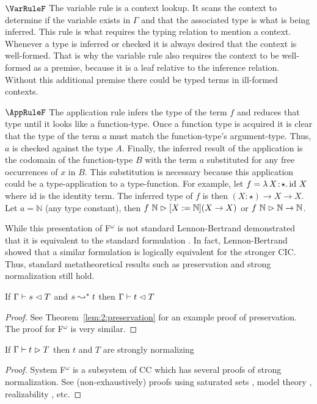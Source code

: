 $\VarRuleF$ The variable rule is a context lookup.
It scans the context to determine if the variable exists in $\Gamma$ and that the associated type is what is being inferred.
This rule is what requires the typing relation to mention a context.
Whenever a type is inferred or checked it is always desired that the context is well-formed.
That is why the variable rule also requires the context to be well-formed as a premise, because it is a leaf relative to the inference relation.
Without this additional premise there could be typed terms in ill-formed contexts.

$\AppRuleF$ The application rule infers the type of the term $f$ and reduces that type until it looks like a function-type.
Once a function type is acquired it is clear that the type of the term $a$ must match the function-type's argument-type.
Thus, $a$ is checked against the type $A$.
Finally, the inferred result of the application is the codomain of the function-type $B$ with the term $a$ substituted for any free occurrences of $x$ in $B$.
This substitution is necessary because this application could be a type-application to a type-function.
For example, let $f = {\lambda}\, X\! : \! \star.\, \text{id}\ X$ where id is the identity term.
The inferred type of $f$ is then $(X : \star) \to X \to X$.
Let $a = \mathbb{N}$ (any type constant), then $f\ \mathbb{N} \vartriangleright [X := \mathbb{N}](X \to X)$ or $f\ \mathbb{N} \infr \mathbb{N} \to \mathbb{N}$.

While this presentation of F$^\omega$ is not standard Lennon-Bertrand demonstrated that it is equivalent to the standard formulation \cite{lennon2021}.
In fact, Lennon-Bertrand showed that a similar formulation is logically equivalent for the stronger CIC.
Thus, standard metatheoretical results such as preservation and strong normalization still hold.

\begin{lemma}
    If $\Gamma \vdash s \vartriangleleft T$ and $s \leadsto^* t$ then $\Gamma \vdash t \vartriangleleft T$
\end{lemma}
\begin{proof}
    See Theorem~\ref{lem:2:preservation} for an example proof of preservation.
    The proof for F$^\omega$ is very similar.
\end{proof}

\begin{theorem}
    If $\Gamma \vdash t \vartriangleright T$ then $t$ and $T$ are strongly normalizing
\end{theorem}
\begin{proof}
    System F$^\omega$ is a subsystem of CC which has several proofs of strong normalization.
    See (non-exhaustively) proofs using saturated sets \cite{geuvers1994_sn_satset}, model theory \cite{terlouw1995_sn}, realizability \cite{ong1993}, etc.
\end{proof}

